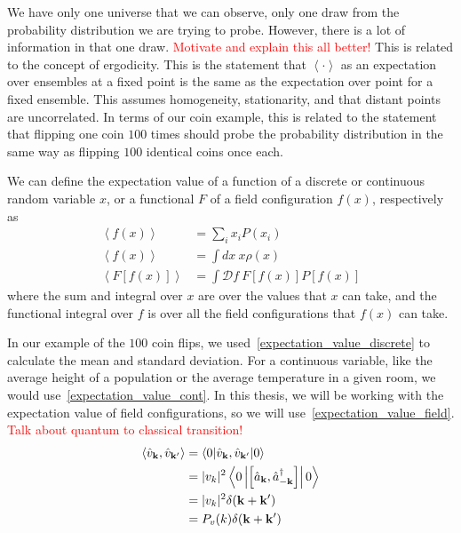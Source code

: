     
    We have only one universe that we can observe, only one draw from the probability distribution
    we are trying to probe. However, there is a lot of information in that one draw.
    \textcolor{red}{Motivate and explain this all better!} This is related to the concept
    of ergodicity. This is the statement that $\left<\cdot\right>$ as an expectation over ensembles
    at a fixed point is the same as the expectation over point for a fixed ensemble.
    This assumes homogeneity, stationarity, and that distant points are uncorrelated.
    In terms of our coin example, this is related to the statement that flipping one coin
    $100$ times should probe the probability distribution in the same way as flipping
    $100$ identical coins once each.


    We can define the expectation value of a function of a discrete or
    continuous random variable $x$, or a functional $F$ of a field configuration $f(x)$, respectively as
    \begin{align}
        \left<f(x)\right> &= \sum_i x_i P(x_i)\label{expectation_value_discrete}\\
        \left<f(x)\right> &= \int dx~x \rho(x)\label{expectation_value_cont}\\
        \left<F\left[f(x)\right]\right> &= \int \mathcal{D}f~F\left[f(x)\right] P\left[f(x)\right]\label{expectation_value_field}
    \end{align}
    where the sum and integral over $x$ are over the values that $x$ can take,
    and the functional integral over $f$ is over all the field configurations
    that $f(x)$ can take.


    In our example of the $100$ coin flips, we used~\eqref{expectation_value_discrete}
    to calculate the mean and standard deviation. For a continuous variable,
    like the average height of a population or the average temperature in a given room,
    we would use~\eqref{expectation_value_cont}. In this thesis, we will be working with
    the expectation value of field configurations, so we will use~\eqref{expectation_value_field}.
    \textcolor{red}{Talk about quantum to classical transition!}
    \begin{align}
        \left<\hat{v}_{\mathbf{k}},\hat{v}_{\mathbf{k}'}\right>
                         &= \left<0|\hat{v}_{\mathbf{k}},\hat{v}_{\mathbf{k}'}|0\right>\\
                         &= |v_k|^2\left<0\left|\left[\hat{a}_{\mathbf{k}},\hat{a}_{-\mathbf{k}}^{\dagger}\right]\right|0\right>\\
                         &= |v_k|^2\delta(\mathbf{k}+\mathbf{k}')\\
                         &= P_{v}(k)\delta(\mathbf{k}+\mathbf{k}')
    \end{align}


